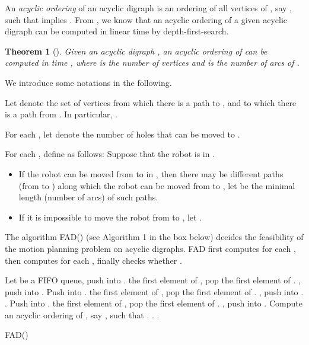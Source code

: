 \documentclass{article}
\newtheorem{thm}{Theorem}
\begin{document}
An \textit{acyclic ordering} of an acyclic digraph  is an
ordering of all vertices of , say , such that
 implies . From \cite{BangGutin00}, we know
that an acyclic ordering of a given acyclic digraph can be computed
in linear time by depth-first-search.

\begin{thm}[\cite{BangGutin00}]\label{thm:acyclic-ordering}
Given an acyclic digraph , an acyclic ordering of  can
be computed in time , where  is the number of vertices
and  is the number of arcs of .
\end{thm}

We introduce some notations in the following.

Let  denote the set of vertices from which there is a path
to , and to which there is a path from . In particular, .

For each , let  denote the number of holes
that can be moved to .

For each , define  as follows: Suppose that
the robot is in .
\begin{itemize}
\item If the robot can be moved from  to  in , then there
may be different paths (from  to ) along which the robot can
be moved from  to , let  be the minimal length (number
of arcs) of such paths.

\item If it is impossible to move the robot from  to , let
.
\end{itemize}

\medskip

The algorithm FAD() (see Algorithm 1 in the box below)
decides the feasibility of the motion planning problem on acyclic
digraphs. FAD first computes  for each , then
computes  for each , finally checks whether
.

\begin{algorithm}[ht]

\dontprintsemicolon \SetVline
{}
Let  be a FIFO queue, push  into .\;
\lForEach{} {}\;
{
the first element of , pop the first element of .\;
{
\If{}
    {, push  into .}
}
}
Push  into .\;
\lForEach{}{\lIf{}{
}\lElse{}}\;
{
the first element of , pop the first element of .\;
{
\If{}
    {, push  into .}
}
}
.\;
\ForEach{}
{
\lForEach{}{}\;
\;
Push  into .\;
{
 the first element of , pop the first element of .\;
{
\If{}
{
, push  into .\;
}
}
}
}
Compute an acyclic ordering of , say ,
such that .\;
.\;
{
{
.\;
}
}
\;
\caption{FAD()\label{Alg:feas-acyclic}}
\end{algorithm}
\end{document}
